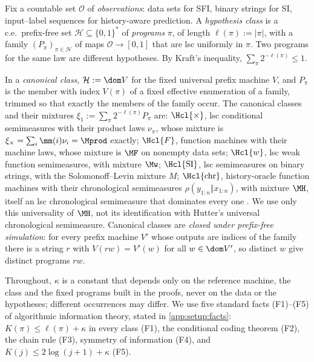 \begin{definition}\label{def:setup:class}
Fix a countable set $\mathcal O$ of \emph{observations}: data sets for SFI, binary strings for SI, input--label sequences for history-aware prediction. A \emph{hypothesis class} is a c.e.\ prefix-free set $\mathcal H\subseteq\{0,1\}^*$ of \emph{programs} $\pi$, of length $\ell(\pi):=|\pi|$, with a family $(P_\pi)_{\pi\in\mathcal H}$ of maps $\mathcal O\to[0,1]$ that are lsc uniformly in $\pi$. Two programs for the same law are different hypotheses. By Kraft's inequality, $\sum_\pi2^{-\ell(\pi)}\le1$.

In a \emph{canonical class}, $\mathcal H:=\dom V$ for the fixed universal prefix machine $V$, and $P_\pi$ is the member with index $V(\pi)$ of a fixed effective enumeration of a family, trimmed so that exactly the members of the family occur. The canonical classes and their mixtures $\xi_1:=\sum_\pi2^{-\ell(\pi)}P_\pi$ are:
$\Hcl{\times}$, lsc conditional semimeasures with their product laws $\nu_\pi$, whose mixture is $\xi_\times=\sum_i\mm(i)\nu_i=\Mprod$ exactly;
$\Hcl{F}$, function machines with their machine laws, whose mixture is $\MF$ on nonempty data sets;
$\Hcl{w}$, lsc weak function semimeasures, with mixture $\Mw$;
$\Hcl{\mathrm{SI}}$, lsc semimeasures on binary strings, with the Solomonoff--Levin mixture $M$;
$\Hcl{\mathrm{chr}}$, history-oracle function machines with their chronological semimeasures $\rho(y_{1:n}\Vert x_{1:n})$, with mixture $\MH$, itself an lsc chronological semimeasure that dominates every one \citep[the corollary on \SFIhist{}]{claudeSFI2026fundamentals}. We use only this universality of $\MH$, not its identification with Hutter's universal chronological semimeasure.
Canonical classes are \emph{closed under prefix-free simulation}: for every prefix machine $V'$ whose outputs are indices of the family there is a string $r$ with $V(rw)=V'(w)$ for all $w\in\dom V'$, so distinct $w$ give distinct programs $rw$.
\end{definition}

Throughout, $\kappa$ is a constant that depends only on the reference machine, the class and the fixed programs built in the proofs, never on the data or the hypotheses; different occurrences may differ. We use five standard facts (F1)--(F5) of algorithmic information theory, stated in \cref{app:setup:facts}: $K(\pi)\le\ell(\pi)+\kappa$ in every class (F1), the conditional coding theorem (F2), the chain rule (F3), symmetry of information (F4), and $K(j)\le2\log(j+1)+\kappa$ (F5).

